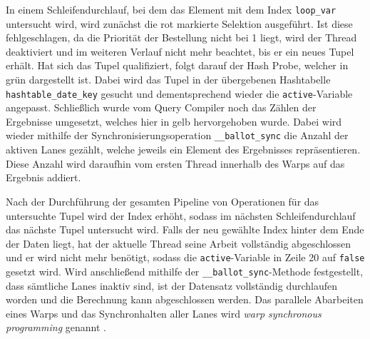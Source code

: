 In einem Schleifendurchlauf, bei dem das Element mit dem Index \texttt{loop\_var} untersucht wird, wird zunächst die rot markierte Selektion ausgeführt.
Ist diese fehlgeschlagen, da die Priorität der Bestellung nicht bei 1 liegt, wird der Thread deaktiviert und im weiteren Verlauf nicht mehr beachtet, bis er ein neues Tupel erhält.
Hat sich das Tupel qualifiziert, folgt darauf der Hash Probe, welcher in grün dargestellt ist.
Dabei wird das Tupel in der übergebenen Hashtabelle \texttt{hashtable\_date\_key} gesucht und dementsprechend wieder die \texttt{active}-Variable angepasst.
Schließlich wurde vom Query Compiler noch das Zählen der Ergebnisse umgesetzt, welches hier in gelb hervorgehoben wurde.
Dabei wird wieder mithilfe der Synchronisierungsoperation \texttt{\_\_ballot\_sync} die Anzahl der aktiven Lanes gezählt, welche jeweils ein Element des Ergebnisses repräsentieren.
Diese Anzahl wird daraufhin vom ersten Thread innerhalb des Warps auf das Ergebnis addiert. 

Nach der Durchführung der gesamten Pipeline von Operationen für das untersuchte Tupel wird der Index erhöht, sodass im nächsten Schleifendurchlauf das nächste Tupel untersucht wird.
Falls der neu gewählte Index hinter dem Ende der Daten liegt, hat der aktuelle Thread seine Arbeit vollständig abgeschlossen und er wird nicht mehr benötigt, sodass die \texttt{active}-Variable in Zeile 20 auf \texttt{false} gesetzt wird.
Wird anschließend mithilfe der \texttt{\_\_ballot\_sync}-Methode festgestellt, dass sämtliche Lanes inaktiv sind, ist der Datensatz vollständig durchlaufen worden und die Berechnung kann abgeschlossen werden.
Das parallele Abarbeiten eines Warps und das Synchronhalten aller Lanes wird \emph{warp synchronous programming} genannt \cite{Lin2018}.

